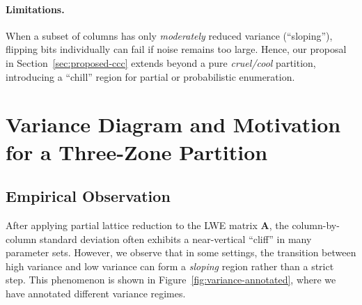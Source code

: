 \documentclass[conference]{IEEEtran}
\begin{document}
\paragraph{Limitations.}
When a subset of columns has only \emph{moderately} reduced variance (``sloping''), flipping bits individually can fail if noise remains too large. 
Hence, our proposal in Section~\ref{sec:proposed-ccc} extends beyond a pure \emph{cruel/cool} partition, introducing a ``chill'' region for partial or probabilistic enumeration.

\section{Variance Diagram and Motivation for a Three-Zone Partition}
\label{sec:3zone-motivation}

\subsection{Empirical Observation}
After applying partial lattice reduction to the LWE matrix $\mathbf{A}$, the column-by-column standard deviation often exhibits a near-vertical ``cliff'' in many parameter sets. However, we observe that in some settings, the transition between high variance and low variance can form a \emph{sloping} region rather than a strict step. This phenomenon is shown in Figure~\ref{fig:variance-annotated}, where we have annotated different variance regimes.
\end{document}
